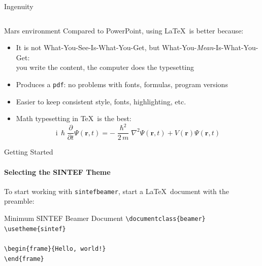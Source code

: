 \begin{frame}{Ingenuity}
\begin{columns}
\end{columns}
\end{frame}



\begin{frame}{Mars environment}
Compared to PowerPoint, using \LaTeX\ is better because:
\begin{itemize}
\item It is not What-You-See-Is-What-You-Get, but
What-You-\emph{Mean}-Is-What-You-Get:\\
you write the content, the computer does the typesetting
\item Produces a \texttt{pdf}: no problems with fonts, formulas,
      program versions
\item Easier to keep consistent style, fonts, highlighting, etc.
\item Math typesetting in \TeX\ is the best:
\begin{equation*}
\mathrm{i}\,\hslash\frac{\partial}{\partial t} \Psi(\mathbf{r},t) =
-\frac{\hslash^2}{2\,m}\nabla^2\Psi(\mathbf{r},t)
+ V(\mathbf{r})\Psi(\mathbf{r},t)
\end{equation*}

\end{itemize}
\end{frame}

\begin{frame}[fragile]{Getting Started}
\framesubtitle{Selecting the SINTEF Theme}
To start working with \texttt{sintefbeamer}, start a \LaTeX\ document with the
preamble:
\begin{block}{Minimum SINTEF Beamer Document}
\verb|\documentclass{beamer}|\\
\verb|\usetheme{sintef}|\\
\verb||\\
\verb|\begin{frame}{Hello, world!}|\\
\verb|\end{frame}|\\
\verb||\\
\end{block}
\end{frame}

